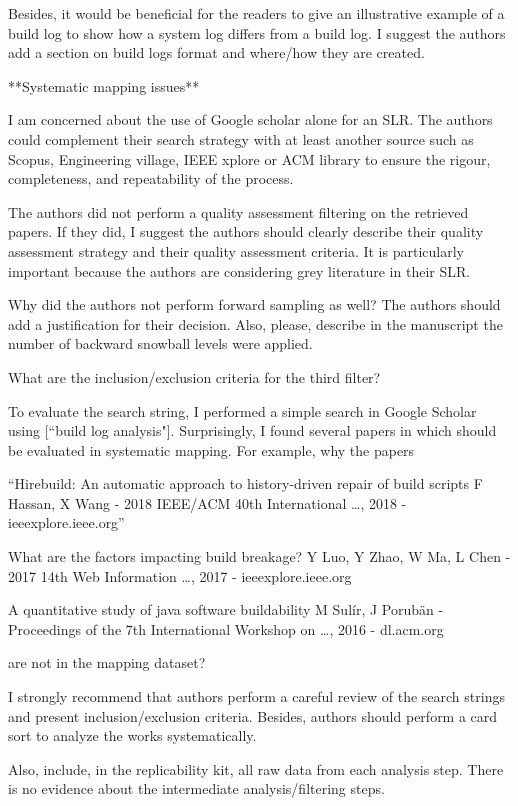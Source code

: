 \documentclass[10pt,a4wide]{article}
\renewenvironment{leftbar}{%
	\vspace{0.1cm}
	\def\FrameCommand{\vrule width 0.4pt \hspace{15pt}}%
	\MakeFramed {\advance\hsize-\width \FrameRestore}}%
{\endMakeFramed\vspace{0.1cm}}
\begin{document}
\begin{leftbar}
Besides, it would be beneficial for the readers to give an illustrative example of a build log to show how a system log differs from a build log. I suggest the authors add a section on build logs format and where/how they are created.


**Systematic mapping issues**

I am concerned about the use of Google scholar alone for an SLR. The authors could complement their search strategy with at least another source such as Scopus, Engineering village, IEEE xplore or ACM library to ensure the rigour, completeness, and repeatability of the process.

The authors did not perform a quality assessment filtering on the retrieved papers. If they did, I suggest the authors should clearly describe their quality assessment strategy and their quality assessment criteria. It is particularly important because the authors are considering grey literature in their SLR.

Why did the authors not perform forward sampling as well? The authors should add a justification for their decision. Also, please, describe in the manuscript the number of backward snowball levels were applied.

What are the inclusion/exclusion criteria for the third filter?

To evaluate the search string, I performed a simple search in Google Scholar using [“build log analysis"]. Surprisingly, I found several papers in which should be evaluated in systematic mapping. For example, why the papers


“Hirebuild: An automatic approach to history-driven repair of build scripts
F Hassan, X Wang - 2018 IEEE/ACM 40th International …, 2018 - ieeexplore.ieee.org”

What are the factors impacting build breakage?
Y Luo, Y Zhao, W Ma, L Chen - 2017 14th Web Information …, 2017 - ieeexplore.ieee.org

A quantitative study of java software buildability
M Sulír, J Porubän - Proceedings of the 7th International Workshop on …, 2016 - dl.acm.org


are not in the mapping dataset?


I strongly recommend that authors perform a careful review of the search strings and present inclusion/exclusion criteria. Besides, authors should perform a card sort to analyze the works systematically.

Also, include, in the replicability kit, all raw data from each analysis step. There is no evidence about the intermediate analysis/filtering steps.



\end{leftbar}
\end{document}
